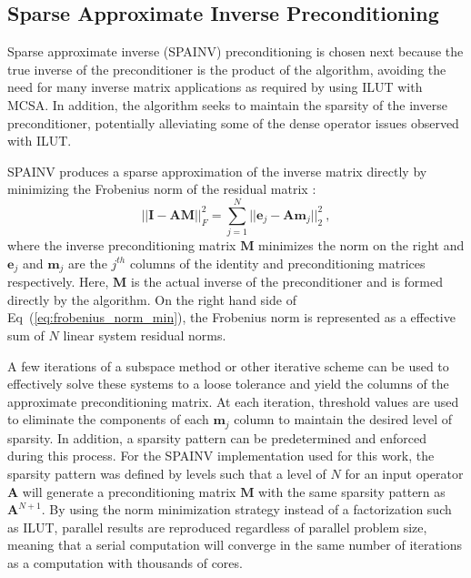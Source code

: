 \subsection{Sparse Approximate Inverse Preconditioning}
\label{subsec:spn_spainv_preconditioning}
Sparse approximate inverse (SPAINV) preconditioning is chosen next
because the true inverse of the preconditioner is the product of the
algorithm, avoiding the need for many inverse matrix applications as
required by using ILUT with MCSA. In addition, the algorithm seeks to
maintain the sparsity of the inverse preconditioner, potentially
alleviating some of the dense operator issues observed with ILUT.

SPAINV produces a sparse approximation of the inverse matrix directly
by minimizing the Frobenius norm of the residual matrix
\cite{saad_iterative_2003}:
\begin{equation}
  || \mathbf{I} - \mathbf{A} \mathbf{M} ||^2_F =
  \sum_{j=1}^N ||\mathbf{e}_j - \mathbf{A} \mathbf{m}_j||^2_2 \:,
  \label{eq:frobenius_norm_min}
\end{equation}
where the inverse preconditioning matrix $\mathbf{M}$ minimizes the
norm on the right and $\mathbf{e}_j$ and $\mathbf{m}_j$ are the
$j^{th}$ columns of the identity and preconditioning matrices
respectively. Here, $\mathbf{M}$ is the actual inverse of the
preconditioner and is formed directly by the algorithm. On the right
hand side of Eq~(\ref{eq:frobenius_norm_min}), the Frobenius norm is
represented as a effective sum of $N$ linear system residual norms. 

A few iterations of a subspace method or other iterative scheme can be
used to effectively solve these systems to a loose tolerance and yield
the columns of the approximate preconditioning matrix. At each
iteration, threshold values are used to eliminate the components of
each $\mathbf{m}_j$ column to maintain the desired level of
sparsity. In addition, a sparsity pattern can be predetermined and
enforced during this process. For the SPAINV implementation used for
this work, the sparsity pattern was defined by levels such that a
level of $N$ for an input operator $\mathbf{A}$ will generate a
preconditioning matrix $\mathbf{M}$ with the same sparsity pattern as
$\mathbf{A}^{N+1}$. By using the norm minimization strategy instead of
a factorization such as ILUT, parallel results are reproduced
regardless of parallel problem size, meaning that a serial computation
will converge in the same number of iterations as a computation with
thousands of cores.

